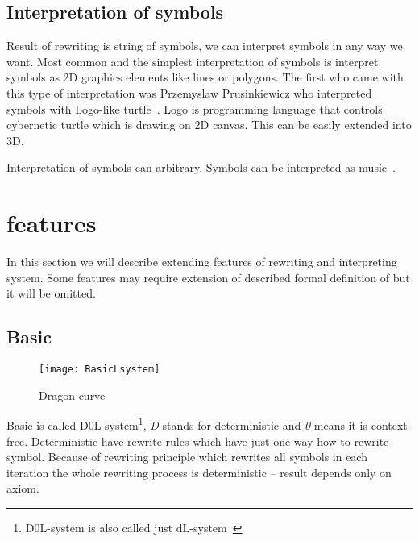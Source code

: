 \subsection{Interpretation of \lsystem symbols}

Result of \lsystem rewriting is string of symbols, we can interpret symbols in any way we want.
Most common and the simplest interpretation of \lsystem symbols is interpret symbols as 2D graphics elements like lines or polygons.
The first who came with this type of interpretation was Przemyslaw Prusinkiewicz who interpreted \lsystem symbols with Logo-like turtle~\cite{Pru85}.
Logo is programming language that controls cybernetic turtle which is drawing on 2D canvas.
This can be easily extended into 3D.

Interpretation of symbols can arbitrary.
Symbols can be interpreted as music~\cite{HCJ99, Man06}.


\section{\lsystem features}

In this section we will describe extending features of \lsystem rewriting and interpreting system.
Some features may require extension of described formal definition of \lsystem but it will be omitted.


\subsection{Basic \lsystem}

\begin{wrapfigure}{r}{0.5\textwidth}
	\vspace{-40pt}
	\begin{center}
	\texttt{[image: BasicLsystem]}
	\end{center}
	\caption{Dragon curve}
	\label{fig:basicLsystem}
\end{wrapfigure}


\newcommand{\dzerolsystem}{\mbox{D0L-system}\xspace}
\newcommand{\dlsystem}{\mbox{dL-system}\xspace}

Basic \lsystem is called \dzerolsystem{}\footnote{\dzerolsystem is also called just \dlsystem~\cite{Zar04}}, \emph{D} stands for deterministic and \emph{0} means it is context-free.
Deterministic \lsystems have rewrite rules which have just one way how to rewrite symbol.
Because of rewriting principle which rewrites all symbols in each iteration the whole rewriting process is deterministic -- result depends only on axiom.

